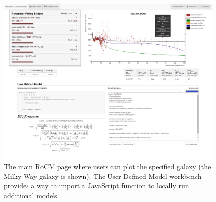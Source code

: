 \documentclass[conference]{IEEEtran-modified}
\begin{document}
\begin{figure}[h!]
\centering
\includegraphics[width=\textwidth, frame, trim = -1cm -1cm -1cm -1cm, clip]{rocm_screenshot_full}
\caption{The main RoCM page where users can plot the specified galaxy (the Milky Way galaxy is shown). The User Defined Model workbench provides a way to import a JavaScript function to locally run additional models.}
\label{rocm_fig}
\end{figure}
\end{document}
